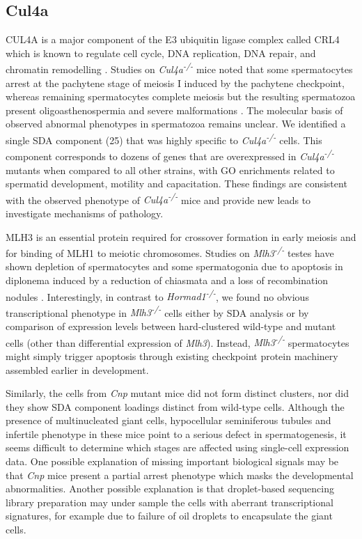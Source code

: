 \subsection{Cul4a}
CUL4A is a major component of the E3 ubiquitin ligase complex called CRL4 which is known to regulate cell cycle, DNA replication, DNA repair, and chromatin remodelling \parencite{Dubiel2018Cullin}. Studies on \textit{Cul4a\textsuperscript{-/-}} mice noted that some spermatocytes arrest at the pachytene stage of meiosis I induced by the pachytene checkpoint, whereas remaining spermatocytes complete meiosis but the resulting spermatozoa present oligoasthenospermia and severe malformations \parencite{Yin2011E3}. The molecular basis of observed abnormal phenotypes in spermatozoa remains unclear. We identified a single SDA component (25) that was highly specific to \textit{Cul4a\textsuperscript{-/-}} cells. This component corresponds to dozens of genes that are overexpressed in \textit{Cul4a\textsuperscript{-/-}} mutants when compared to all other strains, with GO enrichments related to spermatid development, motility and capacitation. These findings are consistent with the observed phenotype of \textit{Cul4a\textsuperscript{-/-}} mice and provide new leads to investigate mechanisms of pathology.

MLH3 is an essential protein required for crossover formation in early meiosis and for binding of MLH1 to meiotic chromosomes. Studies on \textit{Mlh3\textsuperscript{-/-}} testes have shown depletion of spermatocytes and some spermatogonia due to apoptosis in diplonema induced by a reduction of chiasmata and a loss of recombination nodules \parencite{Lipkin2002Meiotic}. Interestingly, in contrast to \textit{Hormad1\textsuperscript{-/-}}, we found no obvious transcriptional phenotype in \textit{Mlh3\textsuperscript{-/-}} cells either by SDA analysis or by comparison of expression levels between hard-clustered wild-type and mutant cells (other than differential expression of \textit{Mlh3}). Instead, \textit{Mlh3\textsuperscript{-/-}} spermatocytes might simply trigger apoptosis through existing checkpoint protein machinery assembled earlier in development.

Similarly, the cells from \textit{Cnp} mutant mice did not form distinct clusters, nor did they show SDA component loadings distinct from wild-type cells. Although the presence of multinucleated giant cells, hypocellular seminiferous tubules and infertile phenotype in these mice point to a serious defect in spermatogenesis, it seems difficult to determine which stages are affected using single-cell expression data. One possible explanation of missing important biological signals may be that \textit{Cnp} mice present a partial arrest phenotype which masks the developmental abnormalities. Another possible explanation is that droplet-based sequencing library preparation may under sample the cells with aberrant transcriptional signatures, for example due to failure of oil droplets to encapsulate the giant cells.

